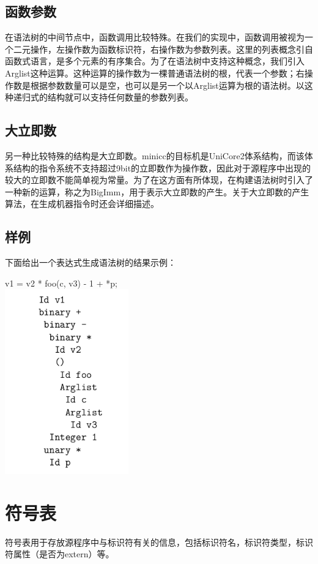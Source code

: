 \documentclass[12pt,a4paper,Flow]{report}
\begin{document}
\subsection{函数参数}
在语法树的中间节点中，函数调用比较特殊。在我们的实现中，函数调用被视为一个二元操作，左操作数为函数标识符，右操作数为参数列表。这里的列表概念引自函数式语言，是多个元素的有序集合。为了在语法树中支持这种概念，我们引入Arglist这种运算。这种运算的操作数为一棵普通语法树的根，代表一个参数；右操作数是根据参数数量可以是空，也可以是另一个以Arglist运算为根的语法树。以这种递归式的结构就可以支持任何数量的参数列表。
\subsection{大立即数}
另一种比较特殊的结构是大立即数。minicc的目标机是UniCore2体系结构，而该体系结构的指令系统不支持超过9bit的立即数作为操作数，因此对于源程序中出现的较大的立即数不能简单视为常量。为了在这方面有所体现，在构建语法树时引入了一种新的运算，称之为BigImm，用于表示大立即数的产生。关于大立即数的产生算法，在生成机器指令时还会详细描述。
\subsection{样例}
下面给出一个表达式生成语法树的结果示例：
\begin{center}
  v1 = v2 * foo(c, v3) - 1 + *p;\\
  \includegraphics[width=0.4\textwidth]{ast-ex.png}
\end{center}
\section{符号表}
符号表用于存放源程序中与标识符有关的信息，包括标识符名，标识符类型，标识符属性（是否为extern）等。
\end{document}
